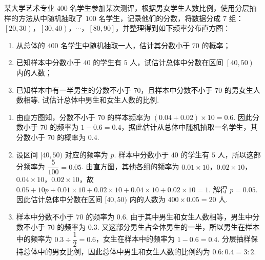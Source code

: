 \begin{problem}

某大学艺术专业 \(400\) 名学生参加某次测评，根据男女学生人数比例，使用分层抽样的方法从中随机抽取了 \(100\) 名学生，记录他们的分数，将数据分成 \(7\) 组：\(\left[20,30\right)\)，\(\left[30,40\right)\)，\(\cdots\)，\(\left[80,90\right]\)，并整理得到如下频率分布直方图：

\begin{enumerate}
\item 从总体的 \(400\) 名学生中随机抽取一人，估计其分数小于 \(70\) 的概率；
\item 已知样本中分数小于 \(40\) 的学生有 \(5\) 人，试估计总体中分数在区间 \(\left[40,50\right)\) 内的人数；
\item 已知样本中有一半男生的分数不小于 \(70\)，且样本中分数不小于 \(70\) 的男女生人数相等. 试估计总体中男生和女生人数的比例.
\end{enumerate}

\begin{center}
\end{center}
\end{problem}

\begin{solution}
\begin{enumerate}
\item 由直方图知，分数不小于 \(70\) 的样本频率为 \((0.04+0.02)\times10=0.6\). 因此分数小于 \(70\) 的频率为 \(1-0.6=0.4\)，据此估计从总体中随机抽取一名学生，其分数小于 \(70\) 的概率为 \(0.4\).
\item 设区间 \([40,50)\) 对应的频率为 \(p\). 样本中分数小于 \(40\) 的学生有 \(5\) 人，所以这部分频率为 \(\dfrac5{100}=0.05\). 由直方图，其他各组的频率为 \(0.01\times10\)，\(0.02\times10\)，\(0.04\times10\)，\(0.02\times10\)，故
\(0.05+10p+0.01\times10+0.02\times10+0.04\times10+0.02\times10=1\).
解得 \(p=0.05\). 因此估计总体中分数在区间 \([40,50)\) 内的人数为 \(400\times0.05=20\) 人.
\item 样本中分数不小于 \(70\) 的频率为 \(0.6\). 由于其中男生和女生人数相等，男生中分数不小于 \(70\) 的频率为 \(0.3\). 又这部分男生占全体男生的一半，所以男生在样本中的频率为 \(0.3\div\dfrac12=0.6\)，女生在样本中的频率为 \(1-0.6=0.4\). 分层抽样保持总体中的男女比例，因此总体中男生和女生人数的比例约为 \(0.6:0.4=3:2\).
\end{enumerate}
\end{solution}

